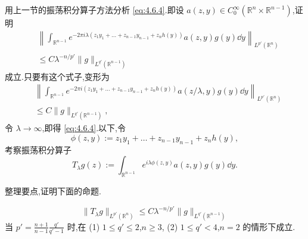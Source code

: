 用上一节的振荡积分算子方法分析 \eqref{eq:4.6.4}.即设 $a(z, y) \in C_{0}^{\infty}(\mathbb{R}^{n}\times\mathbb{R}^{n-1})$,证明
\begin{equation}
\begin{aligned}
& \left\|\int_{\mathbb{R}^{n-1}}e^{-2\pi i\lambda(z_{1}y_{1} + \ldots + z_{n-1}y_{n-1} + z_{n}h(y))}a(z, y)g(y)\dd y\right\|_{L^{p'}(\mathbb{R}^{n})} \\
& \leq C\lambda^{-n/p'}\|g\|_{L^{q'}(\mathbb{R}^{n-1})}
\end{aligned}\tag{4.6.5}
\label{eq:4.6.5}\end{equation}
成立.只要有这个式子,变形为
\begin{equation}
\begin{aligned}
& \left\|\int_{\mathbb{R}^{n-1}}e^{-2\pi i(z_{1}y_{1} + \ldots + z_{n-1}y_{n-1} + z_{n}h(y))}a(z/\lambda, y)g(y)\dd y\right\|_{L^{p'}(\mathbb{R}^{n})} \\
& \leq C\|g\|_{L^{q'}(\mathbb{R}^{n-1})},
\end{aligned}
\end{equation}
令 $\lambda \to \infty$,即得 \eqref{eq:4.6.4}.以下,令
\begin{equation*}
\phi(z, y) := z_{1}y_{1} + \ldots + z_{n-1}y_{n-1} + z_{n}h(y),
\end{equation*}
考察振荡积分算子
\begin{equation*}
T_{\lambda}g(z) := \int_{\mathbb{R}^{n-1}}e^{i\lambda\phi(z, y)}a(z, y)g(y)\dd y.
\end{equation*}

整理要点,证明下面的命题.

\begin{proposition}\label{prop:4.6.2}
\begin{equation}
\|T_{\lambda}g\|_{L^{p'}(\mathbb{R}^{n})} \leq C\lambda^{-n/p'}\|g\|_{L^{q'}(\mathbb{R}^{n-1})}\tag{4.6.6}
\label{eq:4.6.6}\end{equation}
当 $p' = \frac{n+1}{n-1}\frac{q'}{q'-1}$ 时,在
(1) $1 \leq q' \leq 2$,$n \geq 3$,
(2) $1 \leq q' < 4$,$n = 2$
的情形下成立.
\end{proposition}

